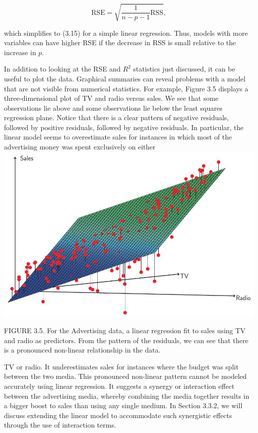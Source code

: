 \documentclass[10pt]{article}
\begin{document}
\begin{equation*}
\mathrm{RSE}=\sqrt{\frac{1}{n-p-1} \mathrm{RSS}}, \tag{3.25}
\end{equation*}


which simplifies to (3.15) for a simple linear regression. Thus, models with more variables can have higher RSE if the decrease in RSS is small relative to the increase in $p$.

In addition to looking at the RSE and $R^{2}$ statistics just discussed, it can be useful to plot the data. Graphical summaries can reveal problems with a model that are not visible from numerical statistics. For example, Figure 3.5 displays a three-dimensional plot of TV and radio versus sales. We see that some observations lie above and some observations lie below the least squares regression plane. Notice that there is a clear pattern of negative residuals, followed by positive residuals, followed by negative residuals. In particular, the linear model seems to overestimate sales for instances in which most of the advertising money was spent exclusively on either\\
\includegraphics[max width=\textwidth, center]{2025_05_05_efe77898333945044de4g-096}

FIGURE 3.5. For the Advertising data, a linear regression fit to sales using TV and radio as predictors. From the pattern of the residuals, we can see that there is a pronounced non-linear relationship in the data.

TV or radio. It underestimates sales for instances where the budget was split between the two media. This pronounced non-linear pattern cannot be modeled accurately using linear regression. It suggests a synergy or interaction effect between the advertising media, whereby combining the media together results in a bigger boost to sales than using any single medium. In Section 3.3.2, we will discuss extending the linear model to accommodate such synergistic effects through the use of interaction terms.
\end{document}
